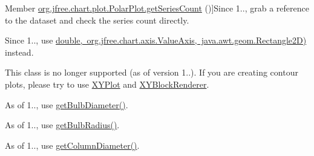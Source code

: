 \begin{DoxyRefList}
Member \mbox{\hyperlink{classorg_1_1jfree_1_1chart_1_1plot_1_1_polar_plot_af848837587b2dce24308e33bbaaffa1a}{org.jfree.chart.plot.Polar\+Plot.get\+Series\+Count}} ()]Since 1.., grab a reference to the dataset and check the series count directly.  
\item[\label{deprecated__deprecated000080}%
\Hypertarget{deprecated__deprecated000080}%
Member \mbox{\hyperlink{classorg_1_1jfree_1_1chart_1_1plot_1_1_polar_plot_ad0a22567a58a649256966f697f2cef2d}{org.jfree.chart.plot.Polar\+Plot.translate\+Value\+Theta\+Radius\+To\+Java2D}} (double angle\+Degrees, double radius, Rectangle2D data\+Area)]Since 1.., use \mbox{\hyperlink{}{double, org.\+jfree.\+chart.\+axis.\+Value\+Axis, java.\+awt.\+geom.\+Rectangle2D)}} instead.  
\item[\label{deprecated__deprecated000084}%
\Hypertarget{deprecated__deprecated000084}%
Class \mbox{\hyperlink{classorg_1_1jfree_1_1chart_1_1plot_1_1_rainbow_palette}{org.jfree.chart.plot.Rainbow\+Palette}} ]This class is no longer supported (as of version 1..). If you are creating contour plots, please try to use \mbox{\hyperlink{classorg_1_1jfree_1_1chart_1_1plot_1_1_x_y_plot}{X\+Y\+Plot}} and \mbox{\hyperlink{}{X\+Y\+Block\+Renderer}}.  
\item[\label{deprecated__deprecated000086}%
\Hypertarget{deprecated__deprecated000086}%
Member \mbox{\hyperlink{classorg_1_1jfree_1_1chart_1_1plot_1_1_thermometer_plot_adc9b029fb081ad0e5e24f0f27c6915d3}{org.jfree.chart.plot.Thermometer\+Plot.B\+U\+L\+B\+\_\+\+D\+I\+A\+M\+E\+T\+ER}} ]As of 1.., use \mbox{\hyperlink{classorg_1_1jfree_1_1chart_1_1plot_1_1_thermometer_plot_a835baa52221fa566e1dfe2867aa220f4}{get\+Bulb\+Diameter()}}.  
\item[\label{deprecated__deprecated000085}%
\Hypertarget{deprecated__deprecated000085}%
Member \mbox{\hyperlink{classorg_1_1jfree_1_1chart_1_1plot_1_1_thermometer_plot_a083cb40ff73e7951a4496f7a6187c60c}{org.jfree.chart.plot.Thermometer\+Plot.B\+U\+L\+B\+\_\+\+R\+A\+D\+I\+US}} ]As of 1.., use \mbox{\hyperlink{classorg_1_1jfree_1_1chart_1_1plot_1_1_thermometer_plot_a37a2c1afb3ae05c507d06c96ca60741e}{get\+Bulb\+Radius()}}.  
\item[\label{deprecated__deprecated000088}%
\Hypertarget{deprecated__deprecated000088}%
Member \mbox{\hyperlink{classorg_1_1jfree_1_1chart_1_1plot_1_1_thermometer_plot_a5b617112eb1108298beb71a3ad618dac}{org.jfree.chart.plot.Thermometer\+Plot.C\+O\+L\+U\+M\+N\+\_\+\+D\+I\+A\+M\+E\+T\+ER}} ]As of 1.., use \mbox{\hyperlink{classorg_1_1jfree_1_1chart_1_1plot_1_1_thermometer_plot_a2acfcde8d30779ac772e20ff81823598}{get\+Column\+Diameter()}}.  

\end{DoxyRefList}
